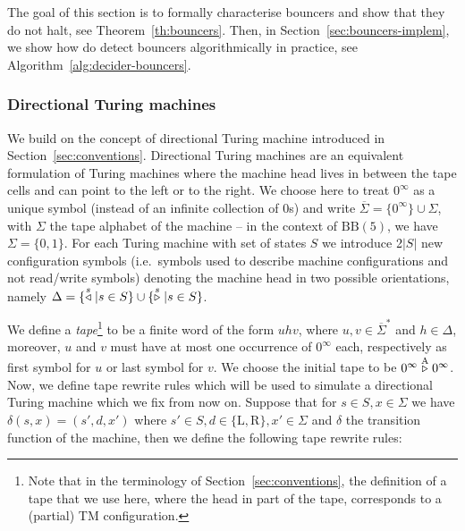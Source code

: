 The goal of this section is to formally characterise bouncers and show that they do not halt, see Theorem~\ref{th:bouncers}. Then, in Section~\ref{sec:bouncers-implem}, we show how do detect bouncers algorithmically in practice, see Algorithm~\ref{alg:decider-bouncers}.

\subsubsection{Directional Turing machines}\label{sec:bouncers:directionalTM}

We build on the concept of directional Turing machine introduced in Section~\ref{sec:conventions}. Directional Turing machines are an equivalent formulation of Turing machines where the machine head lives in between the tape cells and can point to the left or to the right. We choose here to treat $0^\infty$ as a unique symbol (instead of an infinite collection of 0s) and write $\overline{\Sigma} = \{0^\infty\}\cup\Sigma$, with $\Sigma$ the tape alphabet of the machine -- in the context of $\text{BB}(5)$, we have $\Sigma=\{0,1\}$. For each Turing machine with set of states $S$ we introduce 2$|S|$ new configuration symbols (i.e.\ symbols used to describe machine configurations and not read/write symbols) denoting the machine head in two possible orientations, namely $\Delta = \{\stackrel{s}\triangleleft | s\in S\}\cup\{\stackrel{s}\triangleright| s \in S\}$.

We define a \textit{tape}\footnote{Note that in the terminology of Section~\ref{sec:conventions}, the definition of a tape that we use here, where the head in part of the tape, corresponds to a (partial) TM configuration.} to be a finite word of the form $uhv$, where $u,v\in \overline{\Sigma}^*$ and $h\in\Delta$, moreover, $u$ and $v$ must have at most one occurrence of $0^\infty$ each, respectively as first symbol for $u$ or last symbol for $v$. We choose the initial tape to be $0^\infty \stackrel{\text{A}}\triangleright 0^\infty$. Now, we define tape rewrite rules which will be used to simulate a directional Turing machine which we fix from now on. Suppose that for $s\in S, x\in \Sigma$ we have $\delta(s,x) = (s',d,x')$ where $s'\in S, d \in \{\text{L},\text{R}\}, x' \in \Sigma$ and $\delta$ the transition function of the machine, then we define the following tape rewrite rules:


